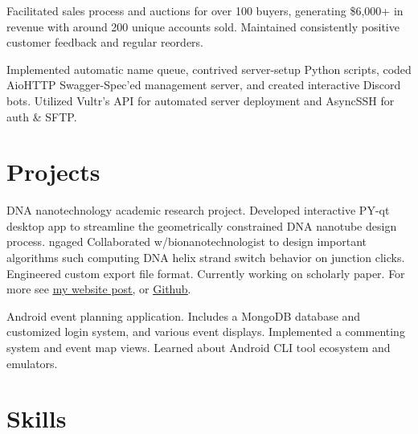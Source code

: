 \documentclass[letterpaper, 10pt]{article}
\begin{document}
		{Facilitated sales process and auctions for over 100 buyers, generating \$6,000+ in revenue with around 200 unique accounts sold. Maintained consistently positive customer feedback and regular reorders.}
		
		{Implemented automatic name queue, contrived server-setup Python scripts, coded AioHTTP Swagger-Spec'ed management server, and created interactive Discord bots. Utilized Vultr's API for automated server deployment and AsyncSSH for auth \& SFTP.}
	\resumeItemListEnd
	
	\resumeSubHeadingListEnd
	
	\section{Projects}
	\resumeSubHeadingListStart
    {DNA nanotechnology academic research project. Developed interactive PY-qt desktop app to streamline the geometrically constrained DNA nanotube design process. ngaged Collaborated w/bionanotechnologist to design important algorithms such computing DNA helix strand switch behavior on junction clicks. Engineered custom export file format. Currently working on scholarly paper. For more see \href{https://404wolf.com/posts/projects/DNANanotubes}{\ul{my website post}}, or \href{https://github.com/NATuG3/NATuG3}{\ul{Github}}.}

		{Android event planning application. Includes a MongoDB database and customized login system, and various event displays. Implemented a commenting system and event map views. Learned about Android CLI tool ecosystem and emulators.}
	\resumeSubHeadingListEnd
	
	\section{Skills}
	\resumeSubHeadingListStart
	
	
	
	\resumeSubHeadingListEnd
\end{document}
